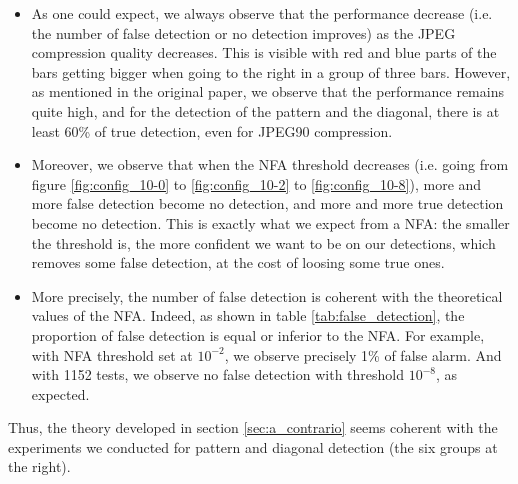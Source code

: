 \documentclass[sigconf, nonacm]{acmart}
\begin{document}
\begin{itemize}
    \item As one could expect, we always observe that the performance decrease (i.e. the number of false detection or no detection improves) as the JPEG compression quality decreases. This is visible with red and blue parts of the bars getting bigger when going to the right in a group of three bars. However, as mentioned in the original paper, we observe that the performance remains quite high, and for the detection of the pattern and the diagonal, there is at least 60\% of true detection, even for JPEG90 compression.
    \item Moreover, we observe that when the NFA threshold decreases (i.e. going from figure \ref{fig:config_10-0} to \ref{fig:config_10-2} to \ref{fig:config_10-8}), more and more false detection become no detection, and more and more true detection become no detection. This is exactly what we expect from a NFA: the smaller the threshold is, the more confident we want to be on our detections, which removes some false detection, at the cost of loosing some true ones.
    \item More precisely, the number of false detection is coherent with the theoretical values of the NFA. Indeed, as shown in table \ref{tab:false_detection}, the proportion of false detection is equal or inferior to the NFA. For example, with NFA threshold set at $10^{-2}$, we observe precisely 1\% of false alarm. And with 1152 tests, we observe no false detection with threshold $10^{-8}$, as expected.
\end{itemize}

Thus, the theory developed in section \ref{sec:a_contrario} seems coherent with the experiments we conducted for pattern and diagonal detection (the six groups at the right).
\end{document}
